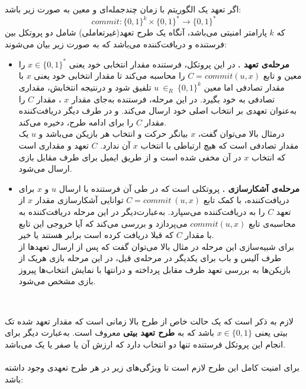 \begin{definition}\label{commit_scheme_define}
اگر  تعهد یک الگوریتم با زمان چندجمله‌ای و  معین به صورت زیر باشد:
$$ commit : \{ 0,1\}^ k \times \{ 0,1\}^ * \rightarrow \{ 0,1 \}^* $$
که
$k$
پارامتر امنیتی می‌باشد، آنگاه یک طرح تعهد(غیرتعاملی) شامل دو پروتکل بین فرستنده و دریافت‌کننده  می‌باشد که به صورت زیر بیان می‌شوند:
\begin{itemize}
\item[]{
\textbf{مرحله‌ی تعهد .}
در این پروتکل، فرستنده مقدار انتخابی خود یعنی 
$x \in \{ 0,1 \}^*$
را معین و تابع
$C = commit(u,x)$
را محاسبه می‌کند تا مقدار انتخابی خود یعنی 
$x$
با مقدار تصادفی اما معین 
$ u ~ {\in}_R ~ \{ 0,1\}^k$
تلفیق شود و درنتیجه انتخابش، مقداری تصادفی به خود بگیرد. در این مرحله، فرستنده به‌جای مقدار 
$x$
، مقدار 
$C$
 را به‌عنوان تعهدی بر انتخاب اصلی خود ارسال می‌کند. و در طرف دیگر دریافت‌کننده مقدار
 $C$
 را برای ادامه طرح، دخیره می‌کند.
\\
درمثال بالا می‌توان گفت،
$x$
بیانگر حرکت و انتخاب هر بازیکن می‌باشد و 
$u$
یک مقدار تصادفی است که هیچ ارتباطی با انتخاب
$x$
آن ندارد. 
$C$
تعهد و مقداری است که انتخاب 
$x$
در آن مخفی شده است و از طریق ایمیل برای طرف مقابل بازی ارسال می‌شود.
}

\item[]{
\textbf{مرحله‌ی آشکارسازی .}
پروتکلی است که در طی آن فرستنده با ارسال
$u$
و
$x$
برای دریافت‌کننده،  با کمک تابع 
$C = commit ~ (u,x)$
توانایی آشکارسازی مقدار
$x$
از تعهد
$C$ 
را به دریافت‌کننده می‌سپارد.
به‌عبارت‌دیگر در این مرحله دریافت‌کننده به محاسبه‌ی تابع
$commit(u,x)$
می‌پردازد و بررسی می‌کند که آیا خروجی این تابع با مقدار  
$C$
که قبلا دریافت کرده است برابر هستند یا خیر.
\\
برای شبیه‌سازی این مرحله در مثال بالا می‌توان گفت که پس از ارسال تعهدها از طرف آلیس و باب برای یکدیگر در مرحله‌ی قبل، در این مرحله بازی هریک از بازیکن‌ها به بررسی تعهد طرف مقابل پرداخته و درانتها با نمایش انتخاب‌ها پیروز بازی مشخص می‌شود.
}
\end{itemize}

\end{definition}~

لازم به ذکر است که یک حالت خاص از طرح بالا زمانی است که مقدار تعهد شده تک بیتی یعنی 
$x \in \{0,1\}$
باشد که به 
\textbf{طرح تعهد بیتی}
 معروف است. به‌عبارت دیگر برای انجام این پروتکل  فرستنده تنها دو انتخاب دارد که ارزش آن یا صفر یا یک می‌باشد.
 \\
 \\
 برای امنیت کامل این طرح لازم است تا ویژگی‌های زیر در هر طرح تعهدی وجود داشته باشد:
 
